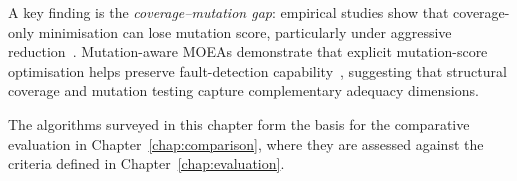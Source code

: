 A key finding is the \emph{coverage--mutation gap}: empirical studies show that coverage-only minimisation can lose mutation score, particularly under aggressive reduction~\cite{noemmer2020,jehan2023}. Mutation-aware MOEAs demonstrate that explicit mutation-score optimisation helps preserve fault-detection capability~\cite{wei2017}, suggesting that structural coverage and mutation testing capture complementary adequacy dimensions.

The algorithms surveyed in this chapter form the basis for the comparative evaluation in Chapter~\ref{chap:comparison}, where they are assessed against the criteria defined in Chapter~\ref{chap:evaluation}.
